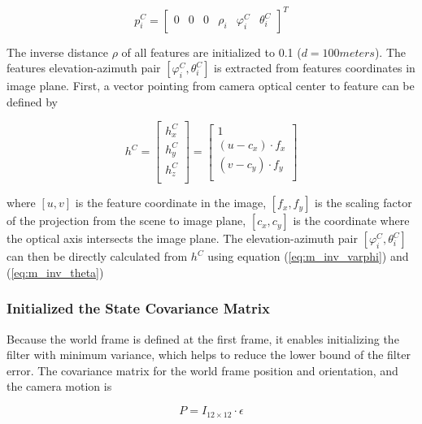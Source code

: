\begin{equation}
p_{i}^{C}=\begin{bmatrix}0&0&0&\rho _{i}&\varphi_{i}^C&\theta_{i}^C\end{bmatrix}^T
\end{equation}

The inverse distance $\rho$ of all features are initialized to 0.1
($d=100 meters$). The features elevation-azimuth pair $[\varphi _{i}^{C},
\theta _{i}^{C}]$ is extracted from features coordinates in image
plane. First, a vector pointing from camera optical center to feature
can be defined by

\begin{equation}
\label{eq:init_feature_unit_vec}
h^{C}=\begin{bmatrix}
h_{x}^{C}\\
h_{y}^{C}\\
h_{z}^{C}\\
\end{bmatrix}
 = \begin{bmatrix}
1 \\
(u-c_x) \cdot f_{x} \\
(v-c_y) \cdot f_{y} \\
\end{bmatrix}
\end{equation}

\noindent where $[u, v]$ is the feature coordinate in the image, $
[f_{x}, f_{y}]$ is the scaling factor of the projection from the scene
to image plane, $[c_x, c_y]$ is the coordinate where the optical axis
intersects the image plane. The elevation-azimuth pair $[\varphi
_{i}^{C}, \theta _{i}^{C}]$ can then be directly calculated from
$h^{C}$ using equation (\ref{eq:m_inv_varphi}) and (\ref{eq:m_inv_theta})

\subsubsection{Initialized the State Covariance Matrix}

Because the world frame is defined at the first frame, it enables 
initializing the filter with minimum variance, which helps to reduce the 
lower bound of the filter error. The covariance matrix for the world frame
position and orientation, and the camera motion is 

\begin{equation}
\label{eq:Pinit}
P=I_{12\times 12}\cdot \epsilon 
\end{equation}

